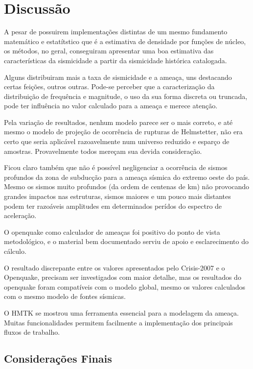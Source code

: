 \chapter{Discussão}
\label{cap:conclusoes}

A pesar de possuirem implementações distintas de um mesmo fundamento matemático e estatítstico
que é a estimativa de densidade por funções de núcleo, os métodos, no geral, conseguiram apresentar
uma boa estimativa das características da sismicidade a partir da sismicidade histórica catalogada.

Alguns distribuiram mais a taxa de sismicidade e a ameaça, uns destacando certas feições, outros outras.
Pode-se perceber que a caracterização da distribuição de frequência e magnitude, o uso da sua forma discreta 
ou truncada, pode ter influência no valor calculado para a ameaça e merece atenção.

Pela variação de resultados, nenhum modelo parece ser o mais correto, e até mesmo 
o modelo de projeção de ocorrência de rupturas de Helmstetter, não era certo que 
seria aplicável razoavelmente num universo reduzido e esparço de amostras.
Provavelmente todos mereçam sua devida consideração.

Ficou claro também que não é possível negligenciar a ocorrência de sismos profundos da zona de subducção
para a ameaça sísmica do extremo oeste do país. Mesmo os sismos muito profundos (da ordem de centenas de km)
não provocando grandes impactos nas estruturas, sismos maiores e um pouco mais distantes podem ter
razoáveis amplitudes em determinados perídos do espectro de aceleração.

O openquake como calculador de ameaças foi positivo do ponto de vista metodológico,
e o material bem documentado serviu de apoio e esclarecimento do cálculo.

O resultado discrepante entre os valores apresentados pelo Crisis-2007 e o Openquake,
precisam ser investigados com maior detalhe, mas os resultados do openquake foram compatíveis com o
modelo global, mesmo os valores calculados com o mesmo modelo de fontes sísmicas.

O HMTK se mostrou uma ferramenta essencial para a modelagem da ameaça. 
Muitas funcionalidades permitem facilmente a implementação dos principais fluxos de trabalho.


\section{Considerações Finais} 


